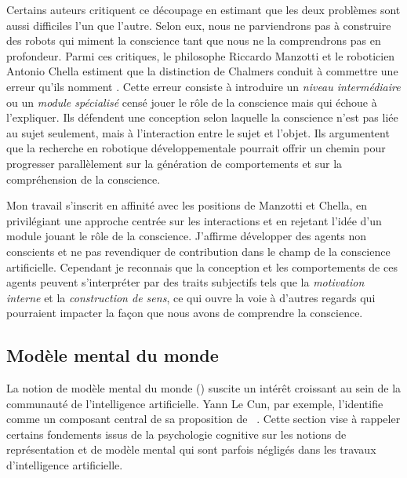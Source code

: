 Certains auteurs critiquent ce découpage en estimant que les deux problèmes sont aussi difficiles l'un que l'autre.
Selon eux, nous ne parviendrons pas à construire des robots qui miment la conscience tant que nous ne la comprendrons pas en profondeur.
Parmi ces critiques, le philosophe Riccardo Manzotti et le roboticien Antonio Chella estiment que la distinction de Chalmers conduit à commettre une erreur qu'ils nomment   \cite{manzotti_good_2018}. 
Cette erreur consiste à introduire un \emph{niveau intermédiaire} ou un \emph{module spécialisé} censé jouer le rôle de la conscience mais qui échoue à l'expliquer. 
Ils défendent une conception selon laquelle la conscience n'est pas liée au sujet seulement, mais à l’interaction entre le sujet et l’objet. 
Ils argumentent que la recherche en robotique développementale pourrait offrir un chemin pour progresser parallèlement sur la génération de comportements et sur la compréhension de la conscience. 


Mon travail s’inscrit en affinité avec les positions de Manzotti et Chella, en privilégiant une approche centrée sur les interactions et en rejetant l'idée d'un module jouant le rôle de la conscience.
J'affirme développer des agents non conscients et ne pas revendiquer de contribution dans le champ de la conscience artificielle.
Cependant je reconnais que la conception et les comportements de ces agents peuvent s'interpréter par des traits subjectifs tels que la  \emph{motivation interne} et la \emph{construction de sens}, ce qui ouvre la voie à d'autres regards qui pourraient impacter la façon que nous avons de comprendre la conscience. 


\subsection{Modèle mental du monde}

\noindent
La notion de modèle mental du monde () suscite un intérêt croissant au sein de la communauté de l'intelligence artificielle.  
Yann Le Cun, par exemple, l'identifie comme un composant central de sa proposition de \og  {} \fg\ \cite{lecun_path_2022}.
Cette section vise à rappeler certains fondements issus de la psychologie cognitive sur les notions de représentation et de modèle mental qui sont parfois négligés dans les travaux d'intelligence artificielle. 

